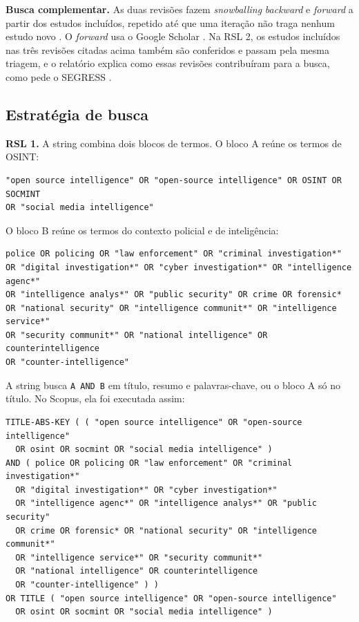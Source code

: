 \textbf{Busca complementar.} As duas revisões fazem \textit{snowballing}
\textit{backward} e \textit{forward} a partir dos estudos incluídos, repetido
até que uma iteração não traga nenhum estudo novo \cite[seção 3.3 e
Figura~1]{wohlin2014}. O \textit{forward} usa o Google Scholar
\cite[seção 3.2.2]{wohlin2014}. Na RSL 2, os estudos incluídos nas três
revisões citadas acima também são conferidos e passam pela mesma triagem, e o
relatório explica como essas revisões contribuíram para a busca, como pede o
SEGRESS \cite[item 7]{kitchenham2023segress}.

\subsection{Estratégia de busca}

\textbf{RSL 1.} A string combina dois blocos de termos. O bloco A reúne os
termos de OSINT:

{\footnotesize
\begin{verbatim}
"open source intelligence" OR "open-source intelligence" OR OSINT OR SOCMINT
OR "social media intelligence"
\end{verbatim}
}

\noindent O bloco B reúne os termos do contexto policial e de inteligência:

{\footnotesize
\begin{verbatim}
police OR policing OR "law enforcement" OR "criminal investigation*"
OR "digital investigation*" OR "cyber investigation*" OR "intelligence agenc*"
OR "intelligence analys*" OR "public security" OR crime OR forensic*
OR "national security" OR "intelligence communit*" OR "intelligence service*"
OR "security communit*" OR "national intelligence" OR counterintelligence
OR "counter-intelligence"
\end{verbatim}
}

\noindent A string busca \texttt{A AND B} em título, resumo e palavras-chave,
ou o bloco A só no título. No Scopus, ela foi executada assim:

{\footnotesize
\begin{verbatim}
TITLE-ABS-KEY ( ( "open source intelligence" OR "open-source intelligence"
  OR osint OR socmint OR "social media intelligence" )
AND ( police OR policing OR "law enforcement" OR "criminal investigation*"
  OR "digital investigation*" OR "cyber investigation*"
  OR "intelligence agenc*" OR "intelligence analys*" OR "public security"
  OR crime OR forensic* OR "national security" OR "intelligence communit*"
  OR "intelligence service*" OR "security communit*"
  OR "national intelligence" OR counterintelligence
  OR "counter-intelligence" ) )
OR TITLE ( "open source intelligence" OR "open-source intelligence"
  OR osint OR socmint OR "social media intelligence" )
\end{verbatim}
}

